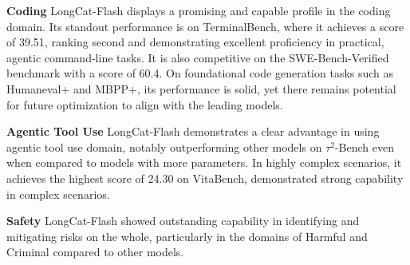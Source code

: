 \documentclass{article}
\newcommand{\longcat}{LongCat-Flash\xspace}
\begin{document}
\textbf{Coding}  \longcat displays a promising and capable profile in the coding domain. Its standout performance is on TerminalBench, where it achieves a score of 39.51, ranking second and demonstrating excellent proficiency in practical, agentic command-line tasks. It is also competitive on the SWE-Bench-Verified benchmark with a score of 60.4. On foundational code generation tasks such as Humaneval+ and MBPP+, its performance is solid, yet there remains potential for future optimization to align with the leading models.

\textbf{Agentic Tool Use}  \longcat demonstrates a clear advantage in using agentic tool use domain, notably outperforming other models on $\tau^2$-Bench even when compared to models with more parameters. In highly complex scenarios, it achieves the highest score of 24.30 on VitaBench, demonstrated strong capability in complex scenarios.

\textbf{Safety}  \longcat showed outstanding capability in identifying and mitigating risks on the whole, particularly in the domains of Harmful and Criminal compared to other models.
\end{document}
